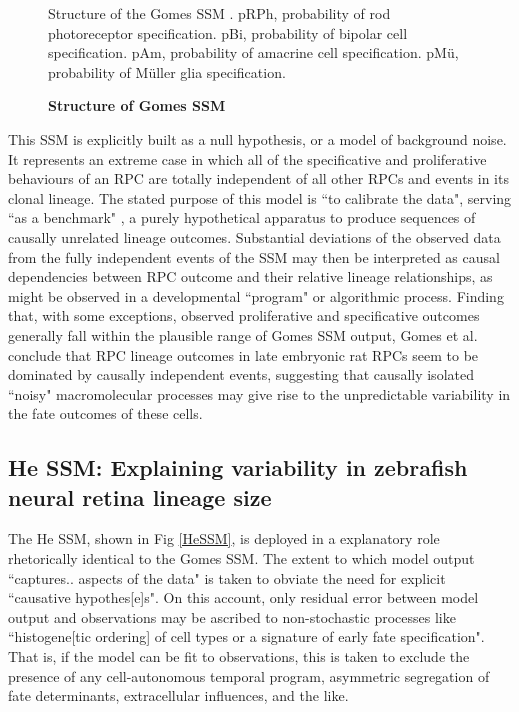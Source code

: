 \begin{figure}[!h]
\caption{{\bf Structure of Gomes SSM}}
Structure of the Gomes SSM \cite{Gomes2011}. pRPh, probability of rod photoreceptor specification. pBi, probability of bipolar cell specification. pAm, probability of amacrine cell specification. pM{\"u}, probability of M{\"u}ller glia specification.
\label{GomesSSM}
\end{figure}
 
This SSM is explicitly built as a null hypothesis, or a model of background noise. It represents an extreme case in which all of the specificative and proliferative behaviours of an RPC are totally independent of all other RPCs and events in its clonal lineage. The stated purpose of this model is ``to calibrate the data", serving ``as a benchmark" \cite{Gomes2011}, a purely hypothetical apparatus to produce sequences of causally unrelated lineage outcomes. Substantial deviations of the observed data from the fully independent events of the SSM may then be interpreted as causal dependencies between RPC outcome and their relative lineage relationships, as might be observed in a developmental ``program" or algorithmic process. Finding that, with some exceptions, observed proliferative and specificative outcomes generally fall within the plausible range of Gomes SSM output, Gomes et al. conclude that RPC lineage outcomes in late embryonic rat RPCs seem to be dominated by causally independent events, suggesting that causally isolated ``noisy" macromolecular processes may give rise to the unpredictable variability in the fate outcomes of these cells. 
 
 \subsection{He SSM: Explaining variability in zebrafish neural retina lineage size}
 
The He SSM, shown in Fig \ref{HeSSM}, is deployed in a explanatory role rhetorically identical to the Gomes SSM. The extent to which model output ``captures.. aspects of the data" is taken to obviate the need for explicit ``causative hypothes[e]s". On this account, only residual error between model output and observations may be ascribed to non-stochastic processes like ``histogene[tic ordering] of cell types or a signature of early fate specification". That is, if the model can be fit to observations, this is taken to exclude the presence of any cell-autonomous temporal program, asymmetric segregation of fate determinants, extracellular influences, and the like. 


